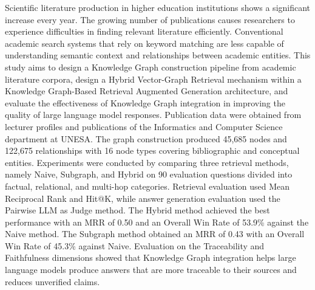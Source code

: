 \begin{Abstract}
    Scientific literature production in higher education institutions shows a significant increase every year. The growing number of publications causes researchers to experience difficulties in finding relevant literature efficiently. Conventional academic search systems that rely on keyword matching are less capable of understanding semantic context and relationships between academic entities. This study aims to design a Knowledge Graph construction pipeline from academic literature corpora, design a Hybrid Vector-Graph Retrieval mechanism within a Knowledge Graph-Based Retrieval Augmented Generation architecture, and evaluate the effectiveness of Knowledge Graph integration in improving the quality of large language model responses. Publication data were obtained from lecturer profiles and publications of the Informatics and Computer Science department at UNESA. The graph construction produced 45,685 nodes and 122,675 relationships with 16 node types covering bibliographic and conceptual entities. Experiments were conducted by comparing three retrieval methods, namely Naive, Subgraph, and Hybrid on 90 evaluation questions divided into factual, relational, and multi-hop categories. Retrieval evaluation used Mean Reciprocal Rank and Hit@K, while answer generation evaluation used the Pairwise LLM as Judge method. The Hybrid method achieved the best performance with an MRR of 0.50 and an Overall Win Rate of 53.9\% against the Naive method. The Subgraph method obtained an MRR of 0.43 with an Overall Win Rate of 45.3\% against Naive. Evaluation on the Traceability and Faithfulness dimensions showed that Knowledge Graph integration helps large language models produce answers that are more traceable to their sources and reduces unverified claims.

\end{Abstract}
